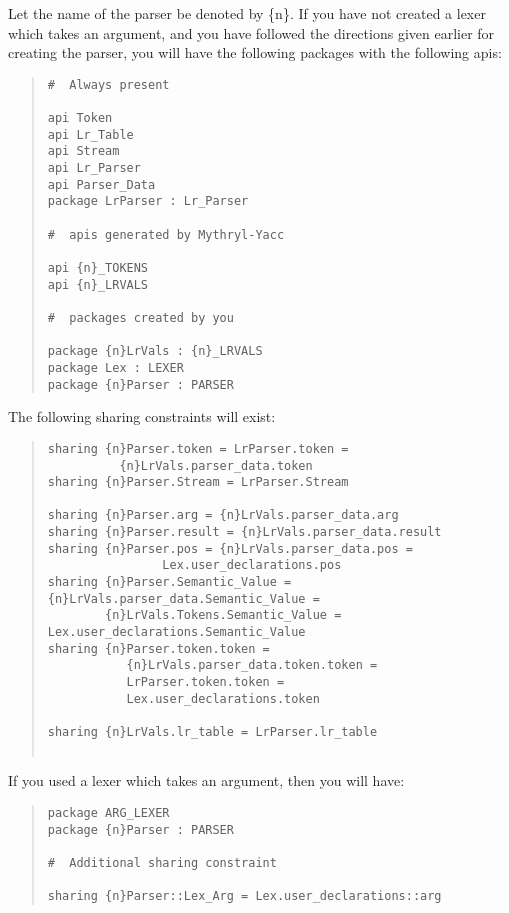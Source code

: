 Let the name of the parser be denoted by \{n\}.  If
you have not created a lexer which takes an argument, and
you have followed the directions given earlier for creating the parser, you
will have the following packages with the following apis:
\begin{quote}
\begin{verbatim}
#  Always present 

api Token
api Lr_Table
api Stream
api Lr_Parser
api Parser_Data
package LrParser : Lr_Parser

#  apis generated by Mythryl-Yacc 

api {n}_TOKENS
api {n}_LRVALS

#  packages created by you 

package {n}LrVals : {n}_LRVALS
package Lex : LEXER
package {n}Parser : PARSER
\end{verbatim}
\end{quote}

The following sharing constraints will exist:
\begin{quote}
\begin{verbatim}
sharing {n}Parser.token = LrParser.token =
          {n}LrVals.parser_data.token
sharing {n}Parser.Stream = LrParser.Stream

sharing {n}Parser.arg = {n}LrVals.parser_data.arg
sharing {n}Parser.result = {n}LrVals.parser_data.result
sharing {n}Parser.pos = {n}LrVals.parser_data.pos =
                Lex.user_declarations.pos
sharing {n}Parser.Semantic_Value = {n}LrVals.parser_data.Semantic_Value =
        {n}LrVals.Tokens.Semantic_Value = Lex.user_declarations.Semantic_Value
sharing {n}Parser.token.token =
           {n}LrVals.parser_data.token.token =
           LrParser.token.token =
           Lex.user_declarations.token

sharing {n}LrVals.lr_table = LrParser.lr_table
        
\end{verbatim}
\end{quote}

If you used a lexer which takes an argument, then you will
have:
\begin{quote}
\begin{verbatim}
package ARG_LEXER
package {n}Parser : PARSER

#  Additional sharing constraint 

sharing {n}Parser::Lex_Arg = Lex.user_declarations::arg
\end{verbatim}
\end{quote}

